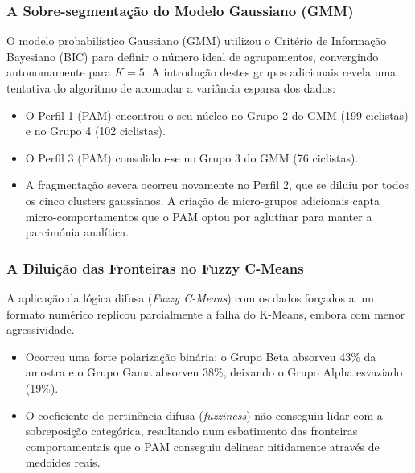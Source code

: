 \documentclass[12pt]{article}
\begin{document}
\subsubsection{A Sobre-segmentação do Modelo Gaussiano (GMM)}
O modelo probabilístico Gaussiano (GMM) utilizou o Critério de Informação Bayesiano (BIC) para definir o número ideal de agrupamentos, convergindo autonomamente para $K=5$. A introdução destes grupos adicionais revela uma tentativa do algoritmo de acomodar a variância esparsa dos dados:
\begin{itemize}
    \item O Perfil 1 (PAM) encontrou o seu núcleo no Grupo 2 do GMM (199 ciclistas) e no Grupo 4 (102 ciclistas).
    \item O Perfil 3 (PAM) consolidou-se no Grupo 3 do GMM (76 ciclistas).
    \item A fragmentação severa ocorreu novamente no Perfil 2, que se diluiu por todos os cinco clusters gaussianos. A criação de micro-grupos adicionais capta micro-comportamentos que o PAM optou por aglutinar para manter a parcimónia analítica.
\end{itemize}

\subsubsection{A Diluição das Fronteiras no Fuzzy C-Means}
A aplicação da lógica difusa (\textit{Fuzzy C-Means}) com os dados forçados a um formato numérico replicou parcialmente a falha do K-Means, embora com menor agressividade.
\begin{itemize}
    \item Ocorreu uma forte polarização binária: o Grupo Beta absorveu 43\% da amostra e o Grupo Gama absorveu 38\%, deixando o Grupo Alpha esvaziado (19\%).
    \item O coeficiente de pertinência difusa (\textit{fuzziness}) não conseguiu lidar com a sobreposição categórica, resultando num esbatimento das fronteiras comportamentais que o PAM conseguiu delinear nitidamente através de medoides reais.
\end{itemize}
\end{document}
